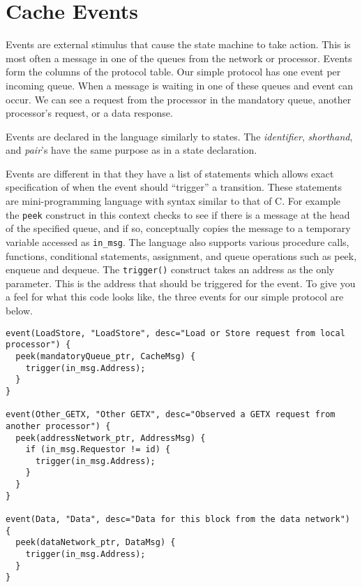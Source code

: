 \documentclass[11pt]{article}
\begin{document}
\section*{Cache Events}

Events are external stimulus that cause the state machine to take
action.  This is most often a message in one of the queues from the
network or processor.  Events form the columns of the protocol table.
Our simple protocol has one event per incoming queue.  When a message
is waiting in one of these queues and event can occur.  We can see a
request from the processor in the mandatory queue, another processor's
request, or a data response.

Events are declared in the language similarly to states.  The {\em
identifier}, {\em shorthand}, and {\em pair}'s have the same purpose
as in a state declaration.  


Events are different in that they have a list of statements which
allows exact specification of when the event should ``trigger'' a
transition.  These statements are mini-programming language with
syntax similar to that of C.  For example the {\tt peek} construct in
this context checks to see if there is a message at the head of the
specified queue, and if so, conceptually copies the message to a
temporary variable accessed as {\tt in\_msg}.  The language also
supports various procedure calls, functions, conditional statements,
assignment, and queue operations such as peek, enqueue and dequeue.
The {\tt trigger()} construct takes an address as the only parameter.
This is the address that should be triggered for the event.  To give
you a feel for what this code looks like, the three events for our
simple protocol are below.

\begin{verbatim}
event(LoadStore, "LoadStore", desc="Load or Store request from local processor") {
  peek(mandatoryQueue_ptr, CacheMsg) {
    trigger(in_msg.Address);
  }
}

event(Other_GETX, "Other GETX", desc="Observed a GETX request from another processor") {
  peek(addressNetwork_ptr, AddressMsg) {
    if (in_msg.Requestor != id) {
      trigger(in_msg.Address);
    }
  }
}
    
event(Data, "Data", desc="Data for this block from the data network") {
  peek(dataNetwork_ptr, DataMsg) {
    trigger(in_msg.Address);
  }
}
\end{verbatim}
\end{document}
